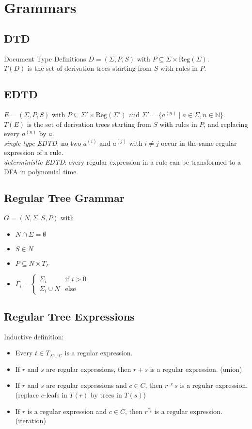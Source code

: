 \documentclass{article}
\begin{document}
\newpage
\section{Grammars}
\subsection{DTD}
Document Type Definitions $D = (\Sigma, P, S)$ with $P \subseteq \Sigma \times \text{Reg}(\Sigma)$. \\
$T(D)$ is the set of derivation trees starting from $S$ with rules in $P$.

\subsection{EDTD}
$E = (\Sigma, P, S)$ with $P \subseteq \Sigma' \times \text{Reg}(\Sigma')$ and $\Sigma' = \{a^{(n)} \mid a \in \Sigma, n \in \mathbb{N}\}$. \\
$T(E)$ is the set of derivation trees starting from $S$ with rules in $P$, and replacing every $a^{(n)}$ by $a$. \\

\textit{single-type EDTD}: no two $a^{(i)}$ and $a^{(j)}$ with $i \neq j$ occur in the same regular expression of a rule. \\

\textit{deterministic EDTD}: every regular expression in a rule can be transformed to a DFA in polynomial time.

\subsection{Regular Tree Grammar}
$G = (N, \Sigma, S, P)$ with
\begin{itemize}
	\item $N \cap \Sigma = \emptyset$
	\item $S \in N$
	\item $P \subseteq N \times T_\Gamma$
	\item $\Gamma_i = \begin{cases} \Sigma_i & \text{if } i > 0 \\ \Sigma_i \cup N & \text{else} \end{cases}$
\end{itemize}

\subsection{Regular Tree Expressions}
Inductive definition:
\begin{itemize}
	\item Every $t \in T_{\Sigma \cup C}$ is a regular expression.
	\item If $r$ and $s$ are regular expressions, then $r + s$ is a regular expression. (union)
	\item If $r$ and $s$ are regular expressions and $c \in C$, then $r \cdot^c s$ is a regular expression. (replace $c$-leafs in $T(r)$ by trees in $T(s)$)
	\item If $r$ is a regular expression and $c \in C$, then $r^{*_c}$ is a regular expression. (iteration)
\end{itemize}
\end{document}

